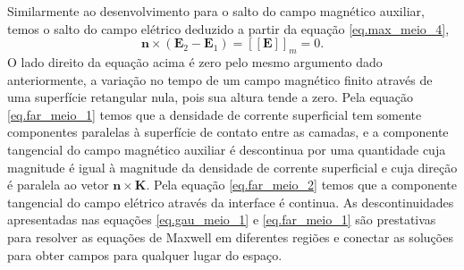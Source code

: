 Similarmente ao desenvolvimento para o salto do campo magn\'etico auxiliar, temos o salto do campo el\'etrico deduzido a partir da equa\c{c}\~ao \ref{eq.max_meio_4},
\begin{equation}\label{eq.far_meio_2}
\mathbf{n}\times(\mathbf{E}_2-\mathbf{E}_1)=\left[\left[\mathbf{E}\right]\right]_m=0.
\end{equation}
O lado direito da equa\c{c}\~ao acima \'e zero pelo mesmo argumento dado anteriormente, a varia\c{c}\~ao no tempo de um campo magn\'etico finito atrav\'es de uma superf\'icie retangular nula, pois sua altura tende a zero.
Pela equa\c{c}\~ao \ref{eq.far_meio_1} temos que a densidade de corrente superficial tem somente componentes paralelas \`a superf\'icie de contato entre as camadas, e a componente tangencial do campo magn\'etico auxiliar \'e descontinua por uma quantidade cuja magnitude \'e igual \`a magnitude da densidade de corrente superficial e cuja dire\c{c}\~ao \'e paralela ao vetor $\mathbf{n}\times\mathbf{K}$. Pela equa\c{c}\~ao \ref{eq.far_meio_2} temos que a componente tangencial do campo el\'etrico atrav\'es da interface \'e continua. As descontinuidades apresentadas nas equa\c{c}\~oes \ref{eq.gau_meio_1} e \ref{eq.far_meio_1} s\~ao prestativas para resolver as equa\c{c}\~oes de Maxwell em diferentes regi\~oes e conectar as solu\c{c}\~oes para obter campos para qualquer lugar do espa\c{c}o.  

